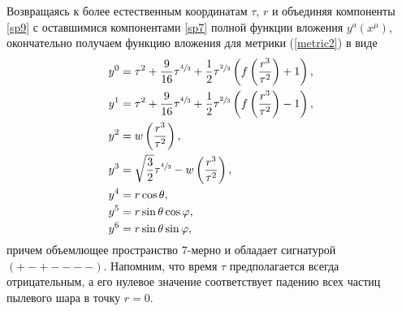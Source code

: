 \documentclass[12pt]{article}
\newcommand{\ls}{\left(}
\newcommand{\rs}{\right)}
\begin{document}
Возвращаясь к более естественным координатам $\tau$, $r$ и объединяя компоненты \eqref{sp9}
с оставшимися компонентами \eqref{sp7} полной функции вложения $y^a(x^\mu)$,
окончательно получаем функцию вложения для метрики (\ref{metric2}) в виде
\begin{align}\label{sp10}
	y^0 &= \tau^2 + \frac{9}{16}\tau^{\sfrac{4}{3}}+\frac{1}{2}\tau^{\sfrac{2}{3}} \ls f\ls\frac{r^3}{\tau^2}\rs+1\rs, \nonumber\\
	y^1 &= \tau^2 + \frac{9}{16}\tau^{\sfrac{4}{3}}+\frac{1}{2}\tau^{\sfrac{2}{3}} \ls f\ls\frac{r^3}{\tau^2}\rs-1\rs, \nonumber\\
	y^2 &=  w\ls\frac{r^3}{\tau^2}\rs, \\
	y^3 &= \sqrt{\frac{3}{2}}\tau^{\sfrac{4}{3}}-w\ls\frac{r^3}{\tau^2}\rs, \nonumber\\
	y^4 &= r \cos{\theta}, \nonumber\\
	y^5 &= r \sin{\theta} \cos{\varphi},  \nonumber\\
	y^6 &= r \sin{\theta} \sin{\varphi},\nonumber
\end{align}
причем объемлющее пространство 7-мерно и обладает сигнатурой $(+-+----)$.
Напомним, что время $\tau$ предполагается всегда отрицательным, а его нулевое значение
соответствует падению всех частиц пылевого шара в точку $r=0$.
\end{document}
